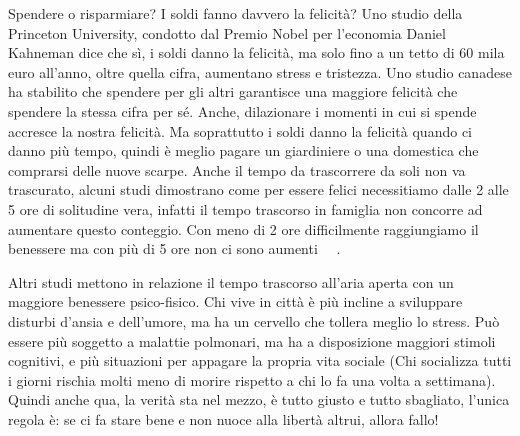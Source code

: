 \documentclass[12pt]{book} %
\begin{document}
\begin{mdframed}[linewidth=1pt]
Spendere o risparmiare? I soldi fanno davvero la felicità? Uno studio della Princeton University, condotto dal Premio
Nobel per l'economia Daniel Kahneman dice che sì, i soldi danno la felicità, ma solo fino a un tetto di 60 mila euro
all'anno, oltre quella cifra, aumentano stress e tristezza. Uno studio canadese ha stabilito che spendere per gli altri
garantisce una maggiore felicità che spendere la stessa cifra per sé. Anche, dilazionare i momenti in cui si spende
accresce la nostra felicità. Ma soprattutto i soldi danno la felicità quando ci danno più tempo, quindi è meglio pagare
un giardiniere o una domestica che comprarsi delle nuove scarpe. Anche il tempo da trascorrere da soli non va
trascurato, alcuni studi dimostrano come per essere felici necessitiamo dalle 2 alle 5 ore di solitudine vera, infatti
il tempo trascorso in famiglia non concorre ad aumentare questo conteggio. Con meno di 2 ore difficilmente raggiungiamo
il benessere ma con più di 5 ore non ci sono aumenti
\ \ .


\bigskip

Altri studi mettono in relazione il tempo trascorso all'aria aperta con un maggiore benessere psico-fisico. Chi vive in
città è più incline a sviluppare disturbi d'ansia e dell'umore, ma ha un cervello che tollera meglio lo stress. Può
essere più soggetto a malattie polmonari, ma ha a disposizione maggiori stimoli cognitivi, e più situazioni per
appagare la propria vita sociale (Chi socializza tutti i giorni rischia molti meno di morire rispetto a chi lo fa una
volta a settimana). Quindi anche qua, la verità sta nel mezzo, è tutto giusto e tutto sbagliato, l'unica regola è:
se ci fa stare bene e non nuoce alla libertà altrui, allora fallo!


\bigskip


\end{mdframed}
\end{document}
